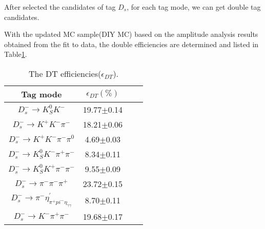 After selected the candidates of tag $D_{s}$, for each tag mode, we can get double tag candidates. %


With the updated MC sample(DIY MC) based on the amplitude analysis results obtained from the fit to data, the double efficiencies are determined and listed in Table\ref{DT-eff}.

    \begin{table}
        \caption{ The DT efficiencies($\epsilon_{DT}$).}
        \label{DT-eff}
        \begin{center}
            \begin{tabular}{cccc}
                \toprule\toprule
                Tag mode   & $\epsilon_{DT}(\%)$\\
                \hline
                $D_{s}^{-} \rightarrow K_{S}^{0}K^{-}$                                                   & 19.77$\pm$0.14\\
                $D_{s}^{-} \rightarrow K^{+}K^{-}\pi^{-}$                                                & 18.21$\pm$0.06\\
                $D_{s}^{-} \rightarrow K^{+}K^{-}\pi^{-}\pi^{0}$                                         &  4.69$\pm$0.03\\
                $D_{s}^{-} \rightarrow K_{S}^{0}K^{-}\pi^{+}\pi^{-}$                                     &  8.34$\pm$0.11\\
                $D_{s}^{-} \rightarrow K_{S}^{0}K^{+}\pi^{-}\pi^{-}$                                     &  9.55$\pm$0.09\\
                $D_{s}^{-} \rightarrow \pi^{-}\pi^{-}\pi^{+}$                                            & 23.72$\pm$0.15\\
                $D_{s}^{-} \rightarrow \pi^{-}\eta_{\pi^{+}pi^{-}\eta_{\gamma\gamma}}^{'}$               &  8.70$\pm$0.11\\
                $D_{s}^{-} \rightarrow K^{-}\pi^{+}\pi^{-}$                                              & 19.68$\pm$0.17\\
                \bottomrule\bottomrule
            \end{tabular}
        \end{center}
    \end{table}

